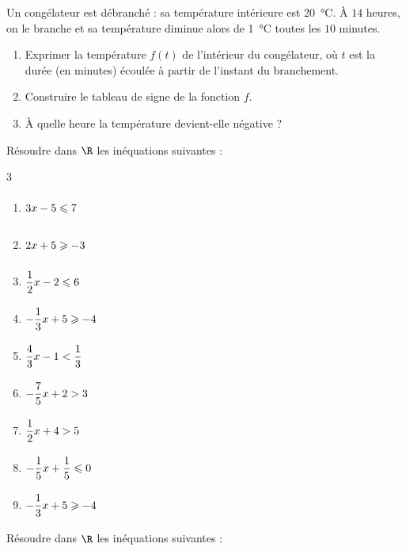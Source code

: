 \exo

Un congélateur est débranché : sa température intérieure est \SI[retain-explicit-plus]{20}{\celsius}. À $14$ heures, on le branche et sa température diminue alors de \SI[retain-explicit-plus]{1}{\celsius} toutes les $10$ minutes.
\begin{enumerate}
\item Exprimer la température $f(t)$ de l'intérieur du congélateur, où $t$ est la durée (en minutes) écoulée à partir de l'instant du branchement.
\item Construire le tableau de signe de la fonction $f$.
\item À quelle heure la température devient-elle négative ?
\end{enumerate}

\exo

Résoudre dans $\R$ les inéquations suivantes :

\vspace{-8pt}
\setlength{\columnsep}{1cm}
\setlength{\columnseprule}{0pt}
\begin{multicols}{3}
\begin{enumerate}
\item $3x-5\leqslant 7\vphantom{\dfrac{h}{p}}$
\smallskip
\item $2x+5\geqslant -3\vphantom{\dfrac{h}{p}}$
\smallskip
\item $\dfrac{1}{2}x-2\leqslant 6\vphantom{\dfrac{h}{p}}$
\smallskip
\item $-\dfrac{1}{3}x+5\geqslant -4\vphantom{\dfrac{h}{p}}$
\smallskip
\item $\dfrac{4}{3}x-1<\dfrac{1}{3}\vphantom{\dfrac{h}{p}}$
\smallskip
\item $-\dfrac{7}{5}x+2>3\vphantom{\dfrac{h}{p}}$
\smallskip
\item $\dfrac{1}{2}x+4>5\vphantom{\dfrac{h}{p}}$
\smallskip
\item $-\dfrac{1}{5}x+\dfrac{1}{5}\leqslant 0\vphantom{\dfrac{h}{p}}$
\smallskip
\item $-\dfrac{1}{3}x+5\geqslant -4\vphantom{\dfrac{h}{p}}$
\end{enumerate}
\end{multicols}

\exo

Résoudre dans $\R$ les inéquations suivantes :

